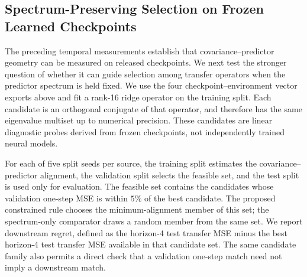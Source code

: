\documentclass{article}
\begin{document}
\subsection{Spectrum-Preserving Selection on Frozen Learned Checkpoints}
\label{sec:supp-learned-selection}

The preceding temporal measurements establish that covariance--predictor
geometry can be measured on released checkpoints. We next test the stronger
question of whether it can guide selection among transfer operators when the
predictor spectrum is held fixed. We use the four checkpoint--environment
vector exports above and fit a rank-16 ridge operator on the training split.
Each candidate is an orthogonal conjugate of that operator, and therefore has
the same eigenvalue multiset up to numerical precision. These candidates are
linear diagnostic probes derived from frozen checkpoints, not independently
trained neural models.

For each of five split seeds per source, the training split estimates the
covariance--predictor alignment, the validation split selects the feasible
set, and the test split is used only for evaluation. The feasible set contains
the candidates whose validation one-step MSE is within $5\%$ of the best
candidate. The proposed constrained rule chooses the minimum-alignment member
of this set; the spectrum-only comparator draws a random member from the same
set. We report downstream regret, defined as the horizon-4 test transfer MSE
minus the best horizon-4 test transfer MSE available in that candidate set.
The same candidate family also permits a direct check that a validation
one-step match need not imply a downstream match.

\begin{table}[H]
\centering
\scriptsize
\setlength{\tabcolsep}{3pt}
\caption{Selection among 17 spectrum-preserving probes derived from frozen
learned checkpoints. Regret is lower-is-better horizon-4 test transfer MSE
relative to the within-family oracle. The alignment rule uses train-only
covariance, while the spectrum-only comparator is random within the
validation-error-constrained set. Entries report means over five split seeds;
intervals are bootstrap intervals over those split seeds.}
\label{tab:supp-learned-selection-17}
\end{table}
\end{document}

